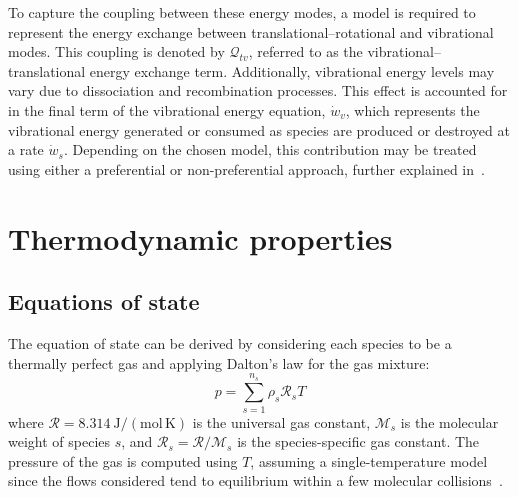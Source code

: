 To capture the coupling between these energy modes, a model is required to represent the energy exchange between translational--rotational and vibrational modes. This coupling is denoted by $\mathcal{Q}_{tv}$, referred to as the vibrational--translational energy exchange term. Additionally, vibrational energy levels may vary due to dissociation and recombination processes. This effect is accounted for in the final term of the vibrational energy equation, $\dot{w}_v$, which represents the vibrational energy generated or consumed as species are produced or destroyed at a rate $\dot{w}_s$. Depending on the chosen model, this contribution may be treated using either a preferential or non-preferential approach, further explained in~.




\section{Thermodynamic properties}
\subsection{Equations of state}\label{section:equation_of_state}
The equation of state can be derived by considering each species to be a thermally perfect gas and applying Dalton's law for the gas mixture:
\begin{equation}
    p = \sum_{s=1}^{n_s} \rho_{s} \mathcal{R}_s T 
\end{equation}
where $\mathcal{R} = 8.314~\mathrm{J/(mol\, K)}$ is the universal gas constant, $\mathcal{M}_s$ is the molecular weight of species $s$, and $\mathcal{R}_s = \mathcal{R}/\mathcal{M}_s$ is the species-specific gas constant. The pressure of the gas is computed using $T$, assuming a single-temperature model since the flows considered tend to equilibrium within a few molecular collisions~\citep{Wagnild2012}.


